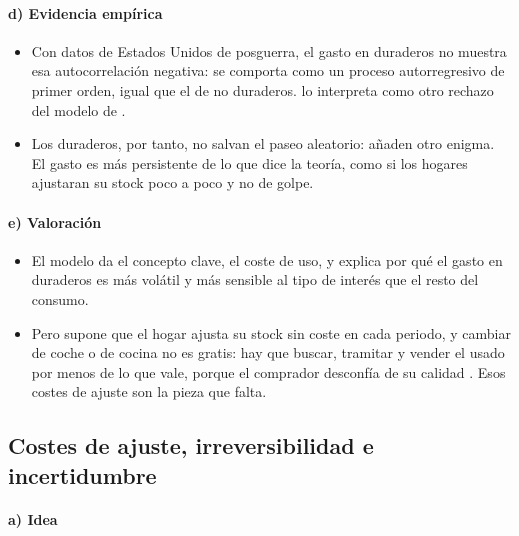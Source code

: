 \documentclass[11pt]{article}
\begin{document}
\paragraph{d) Evidencia empírica}

\begin{itemize}
\item Con datos de Estados Unidos de posguerra, el gasto en duraderos no muestra esa autocorrelación negativa: se comporta como un proceso autorregresivo de primer orden, igual que el de no duraderos.  lo interpreta como otro rechazo del modelo de \nocite{Mankiw1982Hall,Bernanke1985Adjustment}.
\item Los duraderos, por tanto, no salvan el paseo aleatorio: añaden otro enigma. El gasto es más persistente de lo que dice la teoría, como si los hogares ajustaran su stock poco a poco y no de golpe.
\end{itemize}

\paragraph{e) Valoración}

\begin{itemize}
\item El modelo da el concepto clave, el coste de uso, y explica por qué el gasto en duraderos es más volátil y más sensible al tipo de interés que el resto del consumo.
\item Pero supone que el hogar ajusta su stock sin coste en cada periodo, y cambiar de coche o de cocina no es gratis: hay que buscar, tramitar y vender el usado por menos de lo que vale, porque el comprador desconfía de su calidad . Esos costes de ajuste son la pieza que falta.
\end{itemize}

\subsection{Costes de ajuste, irreversibilidad e incertidumbre}\label{sec:duraderos-ajuste}

\paragraph{a) Idea}
\end{document}
